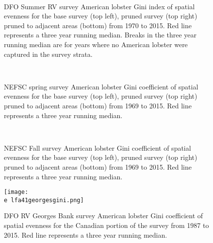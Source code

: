 \documentclass[11pt]{article}
\newcommand{\e}{/backup/bio_data/bio.lobster/figures/} %
\begin{document}
\begin{figure}
\centering
{}
\\
\caption{DFO Summer RV survey American lobster Gini index of spatial evenness for the base survey (top left), pruned survey (top right) pruned to adjacent areas (bottom) from 1970 to 2015. Red line represents a three year running median. Breaks in the three year running median are for years where no American lobster were captured in the survey strata.}
\end{figure}
\clearpage


\begin{figure}
\centering
{}
\\
\caption{NEFSC spring survey American lobster Gini coefficient of spatial evenness for the base survey (top left), pruned survey (top right) pruned to adjacent areas (bottom) from 1969 to 2015. Red line represents a three year running median.  }
\end{figure}
\clearpage



\begin{figure}
\centering
{}
\\
\caption{NEFSC Fall survey American lobster Gini coefficient of spatial evenness for the base survey (top left), pruned survey (top right) pruned to adjacent areas (bottom) from 1969 to 2015. Red line represents a three year running median.  }
\end{figure}
\clearpage


\begin{figure}

    \texttt{[image: \\e lfa41georgesgini.png]}
    \caption{DFO RV Georges Bank survey American lobster Gini coefficient of spatial evenness for the Canadian portion of the survey from 1987 to 2015. Red line represents a three year running median. }

\end{figure}
\end{document}

